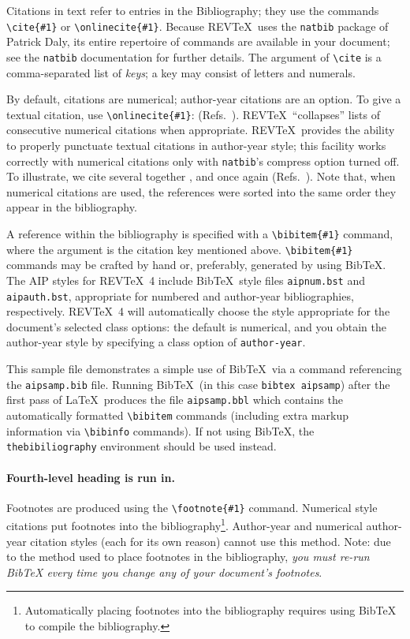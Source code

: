 \documentclass[%
 aip,
 jmp,%
 amsmath,amssymb,
preprint,%
 reprint,%
]{revtex4-2}
\begin{document}
Citations in text refer to entries in the Bibliography;
they use the commands \verb+\cite{#1}+ or \verb+\onlinecite{#1}+.
Because REV\TeX\ uses the \verb+natbib+ package of Patrick Daly,
its entire repertoire of commands are available in your document;
see the \verb+natbib+ documentation for further details.
The argument of \verb+\cite+ is a comma-separated list of \emph{keys};
a key may consist of letters and numerals.

By default, citations are numerical; \cite{feyn54} author-year citations are an option.
To give a textual citation, use \verb+\onlinecite{#1}+: (Refs.~).
REV\TeX\ ``collapses'' lists of consecutive numerical citations when appropriate.
REV\TeX\ provides the ability to properly punctuate textual citations in author-year style;
this facility works correctly with numerical citations only with \texttt{natbib}'s compress option turned off.
To illustrate, we cite several together \cite{feyn54,witten2001,epr,Berman1983},
and once again (Refs.~).
Note that, when numerical citations are used, the references were sorted into the same order they appear in the bibliography.

A reference within the bibliography is specified with a \verb+\bibitem{#1}+ command,
where the argument is the citation key mentioned above.
\verb+\bibitem{#1}+ commands may be crafted by hand or, preferably,
generated by using Bib\TeX.
The AIP styles for REV\TeX~4 include Bib\TeX\ style files
\verb+aipnum.bst+ and \verb+aipauth.bst+, appropriate for
numbered and author-year bibliographies,
respectively.
REV\TeX~4 will automatically choose the style appropriate for
the document's selected class options: the default is numerical, and
you obtain the author-year style by specifying a class option of \verb+author-year+.

This sample file demonstrates a simple use of Bib\TeX\
via a \verb++ command referencing the \verb+aipsamp.bib+ file.
Running Bib\TeX\ (in this case \texttt{bibtex
  aipsamp}) after the first pass of \LaTeX\ produces the file
\verb+aipsamp.bbl+ which contains the automatically formatted
\verb+\bibitem+ commands (including extra markup information via
\verb+\bibinfo+ commands). If not using Bib\TeX, the
\verb+thebibiliography+ environment should be used instead.

\paragraph{Fourth-level heading is run in.}%
Footnotes are produced using the \verb+\footnote{#1}+ command.
Numerical style citations put footnotes into the
bibliography\footnote{Automatically placing footnotes into the bibliography requires using BibTeX to compile the bibliography.}.
Author-year and numerical author-year citation styles (each for its own reason) cannot use this method.
Note: due to the method used to place footnotes in the bibliography, \emph{you
  must re-run BibTeX every time you change any of your document's
  footnotes}.
\end{document}
